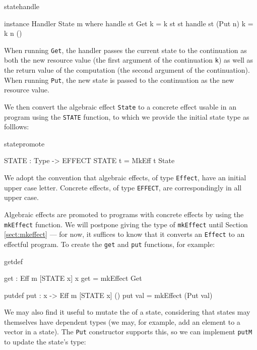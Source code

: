 \begin{SaveVerbatim}{statehandle}

instance Handler State m where
     handle st Get     k = k st st
     handle st (Put n) k = k n ()

\end{SaveVerbatim}

\noindent
When running \texttt{Get}, the handler passes the current state to the
continuation as both the new resource value (the first argument of the
continuation \texttt{k}) as well as the return value of the computation (the
second argument of the continuation). When running \texttt{Put}, the new state
is passed to the continuation as the new resource value.

We then convert the algebraic effect \texttt{State} to a concrete
effect usable in an \Eff{} program using the \texttt{STATE} function, to which
we provide the initial state type as folllows:

\begin{SaveVerbatim}{statepromote}

STATE : Type -> EFFECT
STATE t = MkEff t State

\end{SaveVerbatim}

\noindent
We adopt the convention that algebraic effects, of type \texttt{Effect},
have an initial upper case letter. Concrete effects, of type \texttt{EFFECT},
are correspondingly in all upper case.

Algebraic effects are promoted to \Eff{} programs with concrete effects
by using the
\texttt{mkEffect} function. We will postpone giving the type of
\texttt{mkEffect} until Section \ref{sect:mkeffect} --- for now,
it suffices to know that it converts an
\texttt{Effect} to an effectful program. To create the \texttt{get} and
\texttt{put} functions, for example:

\begin{SaveVerbatim}{getdef}

get : Eff m [STATE x] x
get = mkEffect Get 

\end{SaveVerbatim}

\begin{SaveVerbatim}{putdef}
put : x -> Eff m [STATE x] ()
put val = mkEffect (Put val)

\end{SaveVerbatim}

\noindent
We may also find it useful to mutate the  of a state, considering
that states may themselves have dependent types (we may, for example, add
an element to a vector in a state). The \texttt{Put} constructor supports this,
so we can implement \texttt{putM} to update the state's type:

